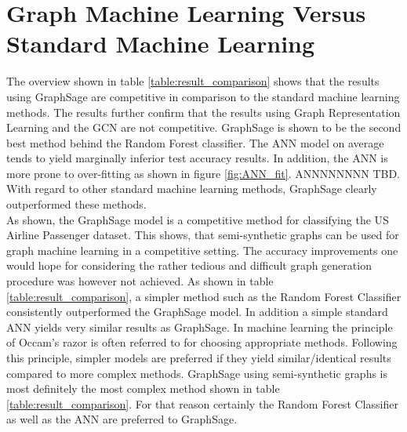   \section{Graph Machine Learning Versus Standard Machine Learning}

  The overview shown in table \ref{table:result_comparison} shows that the
  results using GraphSage are competitive in comparison to the standard machine
  learning methods. The results further confirm that the results using Graph
  Representation Learning and the GCN are not competitive. GraphSage is shown
  to be the second best method behind the Random Forest classifier. The ANN
  model on average tends to yield marginally inferior test accuracy results. In
  addition, the ANN is more prone to over-fitting as shown in figure
  \ref{fig:ANN_fit}. ANNNNNNNN TBD. With regard to other standard machine
  learning methods, GraphSage clearly outperformed these methods. \\

  \noindent As shown, the GraphSage model is a competitive method for 
  classifying the US Airline Passenger dataset. This shows, that semi-synthetic
  graphs can be used for graph machine learning in a competitive setting. The
  accuracy improvements one would hope for considering the rather tedious and
  difficult graph generation procedure was however not achieved. As shown in
  table \ref{table:result_comparison}, a simpler method such as the Random
  Forest Classifier consistently outperformed the GraphSage model. In addition
  a simple standard ANN yields very similar results as GraphSage. In machine 
  learning the principle of Occam's razor is often referred to for choosing 
  appropriate methods. Following this principle, simpler models are preferred if 
  they yield similar/identical results compared to more complex methods.
  GraphSage using semi-synthetic graphs is most definitely the most complex 
  method shown in table \ref{table:result_comparison}. For that reason certainly 
  the Random Forest Classifier as well as the ANN are preferred to GraphSage.  





